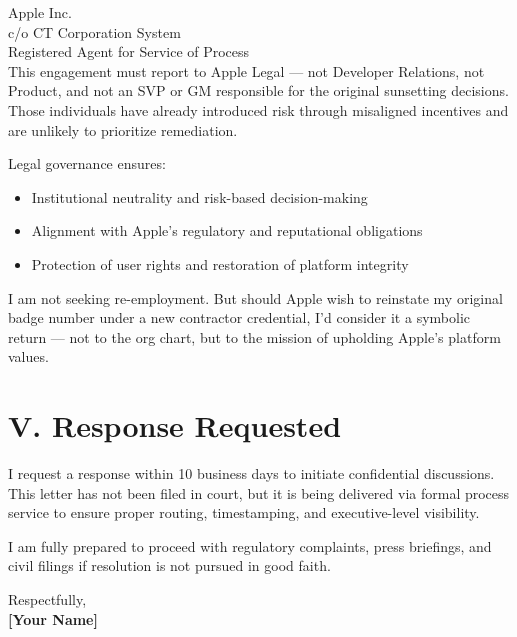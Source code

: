 \documentclass[11pt]{letter}
\begin{document}
\begin{letter}{Apple Inc.\\
    c/o CT Corporation System\\
    Registered Agent for Service of Process\\
    [Insert DE or CA Address Here]}
        This engagement must report to Apple Legal — not Developer Relations, not Product, and not an SVP or GM responsible for the original sunsetting decisions. Those individuals have already introduced risk through misaligned incentives and are unlikely to prioritize remediation.

        Legal governance ensures:
        \begin{itemize}
            \item Institutional neutrality and risk-based decision-making
            \item Alignment with Apple’s regulatory and reputational obligations
            \item Protection of user rights and restoration of platform integrity
        \end{itemize}

        I am not seeking re-employment. But should Apple wish to reinstate my original badge number under a new contractor credential, I’d consider it a symbolic return — not to the org chart, but to the mission of upholding Apple’s platform values.

        \section*{V. Response Requested}

        I request a response within 10 business days to initiate confidential discussions. This letter has not been filed in court, but it is being delivered via formal process service to ensure proper routing, timestamping, and executive-level visibility.

        I am fully prepared to proceed with regulatory complaints, press briefings, and civil filings if resolution is not pursued in good faith.

        \closing{Respectfully,\\[1em]
        \textbf{[Your Name]}\\
        \vspace{1em}
         \\
        [Email Address] \\
        [Phone Number]}

    \end{letter}
\end{document}

